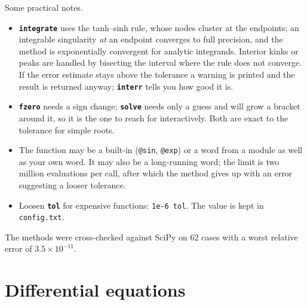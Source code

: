 \documentclass[11pt,letterpaper]{article}
\newcommand{\code}[1]{\texttt{#1}}
\newcommand{\cmd}[1]{\texttt{\textbf{#1}}}
\begin{document}
Some practical notes.
\begin{itemize}
  \item \cmd{integrate} uses the tanh--sinh rule, whose nodes cluster at the endpoints; an integrable singularity \emph{at} an endpoint converges to full precision, and the method is exponentially convergent for analytic integrands. Interior kinks or peaks are handled by bisecting the interval where the rule does not converge. If the error estimate stays above the tolerance a warning is printed and the result is returned anyway; \cmd{interr} tells you how good it is.
  \item \cmd{fzero} needs a sign change; \cmd{solve} needs only a guess and will grow a bracket around it, so it is the one to reach for interactively. Both are exact to the tolerance for simple roots.
  \item The function may be a built-in (\code{@sin}, \code{@exp}) or a word from a module as well as your own word. It may also be a long-running word; the limit is two million evaluations per call, after which the method gives up with an error suggesting a looser tolerance.
  \item Loosen \cmd{tol} for expensive functions: \code{1e-6 tol}. The value is kept in \code{config.txt}.
\end{itemize}
The methods were cross-checked against SciPy on 62 cases with a worst relative error of $3.5\times10^{-11}$.

\section{Differential equations}
\label{sec:ode}
\end{document}
